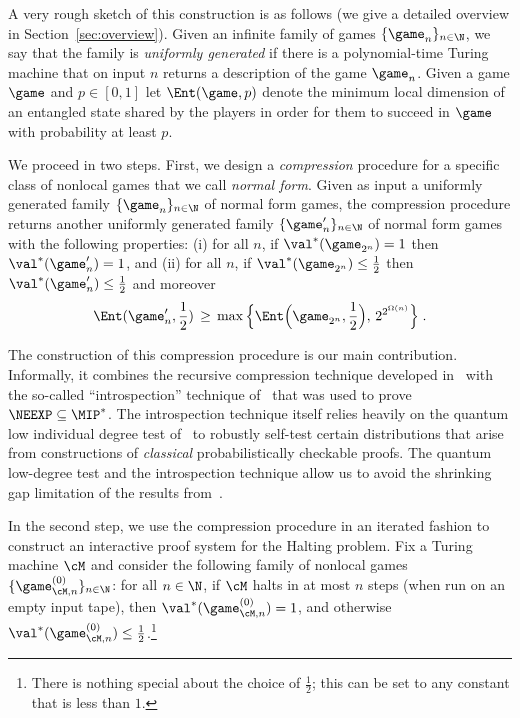 A very rough sketch of this construction is as follows (we give a detailed overview in Section~\ref{sec:overview}). Given an infinite family of games $\{ \game_n \}_{n \in \N}$, we say that the family is \emph{uniformly generated} if there is a polynomial-time Turing machine that on input $n$ returns a description of the game $\game_n$. Given a game $\game$ and $p\in[0,1]$ let $\Ent(\game,p)$ denote the minimum local dimension of an entangled state shared by the players in order for them to succeed in $\game$ with probability at least $p$. 

We proceed in two steps. First, we design a \emph{compression} procedure for a specific class of nonlocal games that we call \emph{normal form}. Given as input a uniformly generated family $\{ \game_{n} \}_{n \in \N}$ of normal form games, the compression procedure returns another uniformly generated family $\{\game'_{n}\}_{n \in \N}$ of normal form games with the following properties: (i) for all $n$, if $\val^*(\game_{2^n})=1$ then $\val^*(\game'_n)=1$, and (ii) for all $n$, if $\val^*(\game_{2^n})\leq \frac{1}{2}$ then $\val^*(\game'_n)\leq \frac{1}{2}$ and moreover
\[ \Ent(\game'_{n},\frac{1}{2})\,\geq\, \max \Big\{ \Ent\Big(\game_{2^n},\frac{1}{2}\Big), \,2^{2^{\Omega(n)}} \Big\}\;.\] 

The construction of this compression procedure is our main contribution. Informally, it combines the recursive compression technique developed in~\cite{ji2017compression,fitzsimons2018quantum} with the so-called ``introspection'' technique of~\cite{NW19} that was used to prove $\NEEXP \subseteq \MIP^*$. The introspection technique itself relies heavily on the quantum low individual degree test of~\cite{natarajan2018low,ML20} to robustly self-test certain distributions that arise from constructions of \emph{classical} probabilistically checkable proofs. The quantum low-degree test and the introspection technique allow us to avoid the shrinking gap limitation of the results from~\cite{fitzsimons2018quantum}. 




In the second step, we use the compression procedure in an iterated fashion to construct an interactive proof system for the Halting problem. Fix a Turing machine $\cM$ and consider the following family  of nonlocal games $\{\game_{\cM,n}^{(0)}\}_{n\in\N}$: for all $n \in \N$, if $\cM$ halts in at most $n$ steps (when run on an empty input tape), then $\val^*(\game_{\cM,n}^{(0)})=1$, and otherwise  $\val^*(\game_{\cM,n}^{(0)}) \leq \frac{1}{2}$.\footnote{There is nothing special about the choice of $\frac{1}{2}$; this can be set to any constant that is less than $1$.} 

